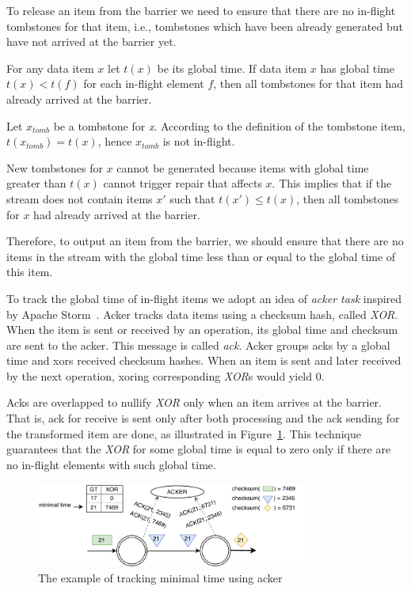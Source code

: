 To release an item from the barrier we need to ensure that there are no in-flight tombstones for that item, i.e., tombstones which have been already generated but have not arrived at the barrier yet.


\begin{theorem}
  For any data item $x$ let $t(x)$ be its global time. If data item $x$ has global time $t(x) < t(f)$ for each in-flight element $f$, then all tombstones for that item had already arrived at the barrier.
\end{theorem}

\begin{sketch}
  Let $x_{tomb}$ be a tombstone for {\it x}. According to the definition of the tombstone item, $t(x_{tomb}) = t(x)$, hence $x_{tomb}$ is not in-flight.
  
  New tombstones for $x$ cannot be generated because items with global time greater than $t(x)$ cannot trigger repair that affects $x$. This implies that if the stream does not contain items $x\prime$ such that $t(x\prime) \le t(x)$, then all tombstones for $x$ had already arrived at the barrier.
\end{sketch}

Therefore, to output an item from the barrier, we should ensure that there are no items in the stream with the global time less than or equal to the global time of this item.

To track the global time of in-flight items we adopt an idea of {\it acker task} inspired by Apache Storm~\cite{apache:storm}. Acker tracks data items using a checksum hash, called {\it XOR}. When the item is sent or received by an operation, its global time and checksum are sent to the acker. This message is called {\it ack}. Acker groups acks by a global time and xors received checksum hashes. When an item is sent and later received by the next operation, xoring corresponding {\it XOR}s would yield 0.

Acks are overlapped to nullify {\it XOR} only when an item arrives at the barrier. That is, ack for receive is sent only after both processing and the ack sending for the transformed item are done, as illustrated in Figure~\ref{acker}. This technique guarantees that the {\it XOR} for some global time is equal to zero only if there are no in-flight elements with such global time.

\begin{figure}[t]
  \centering
  \includegraphics[width=0.8\textwidth]{Chapters/DeterministicModelRuntime/pics/acker.pdf}
  \caption{The example of tracking minimal time using acker}
  \label {acker}
\end{figure}

